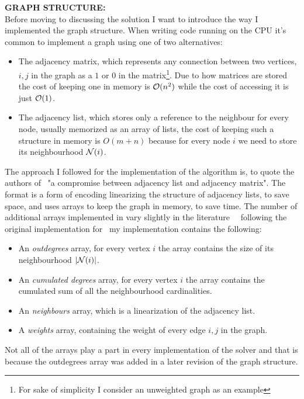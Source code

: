 \documentclass[a4paper,10pt]{article}
\begin{document}
\bigskip
{}
\makeatletter{}\makeatother\label{sec:graph-structure}
\noindent
\textbf{GRAPH STRUCTURE:}
\\
Before moving to discussing the solution I want to introduce the way I implemented the graph structure. When writing code running on the CPU it's common to implement a graph using one of two alternatives:
\begin{itemize}
	\item The adjacency matrix, which represents any connection between two vertices, $i, j$ in the graph as a $1$ or $0$ in the matrix\footnote{For sake of simplicity I consider an unweighted graph as an example}. Due to how matrices are stored the cost of keeping one in memory is $\mathcal{O}(n^2)$ while the cost of accessing it is just $\mathcal{O}(1)$.
	\item The adjacency list, which stores only a reference to the neighbour for every node, usually memorized as an array of lists, the cost of keeping such a structure in memory is $O(m + n)$ because for every node $i$ we need to store its neighbourhood $\mathcal{N}(i)$.
\end{itemize}
The approach I followed for the implementation of the algorithm is, to quote the authors of~\cite{generic-he-boruvka} "a compromise between adjacency list and adjacency matrix". The \csr format is a form of encoding linearizing the structure of adjacency lists, to save space, and uses arrays to keep the graph in memory, to save time. The number of additional arrays implemented in \csr vary slightly in the literature~\cite{csr-kelly}~\cite{csr-wheatman} following the original implementation for~\cite{generic-he-boruvka} my implementation contains the following:
\begin{itemize}
	\item An \emph{outdegrees} array, for every vertex $i$ the array contains the size of its neighbourhood $|\mathcal{N}(i)|$.
	\item An \emph{cumulated degrees} array, for every vertex $i$ the array contains the cumulated sum of all the neighbourhood cardinalities.
	\item An \emph{neighbours} array, which is a linearization of the adjacency list.
	\item A \emph{weights} array, containing the weight of every edge $i, j$ in the graph.
\end{itemize}
Not all of the arrays play a part in every implementation of the solver and that is because the outdegrees array was added in a later revision of the graph structure.
\end{document}
